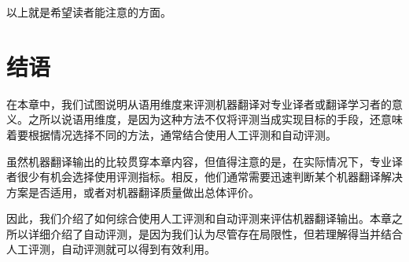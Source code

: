 \documentclass[output=paper]{langscibook}
\begin{document}
以上就是希望读者能注意的方面。


\section{结语}
在本章中，我们试图说明从语用维度来评测机器翻译对专业译者或翻译学习者的意义。之所以说语用维度，是因为这种方法不仅将评测当成实现目标的手段，还意味着要根据情况选择不同的方法，通常结合使用人工评测和自动评测。

虽然机器翻译输出的比较贯穿本章内容，但值得注意的是，在实际情况下，专业译者很少有机会选择使用评测指标。相反，他们通常需要迅速判断某个机器翻译解决方案是否适用，或者对机器翻译质量做出总体评价。

因此，我们介绍了如何综合使用人工评测和自动评测来评估机器翻译输出。本章之所以详细介绍了自动评测，是因为我们认为尽管存在局限性，但若理解得当并结合人工评测，自动评测就可以得到有效利用。



\sloppy
\printbibliography[heading=subbibliography,notkeyword=this]
\end{document}
